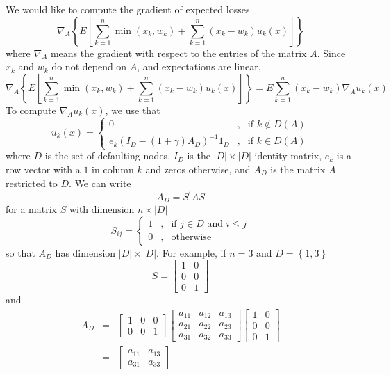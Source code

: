 \documentclass{article}
\begin{document}
We would like to compute the gradient of expected losses%
\[
\nabla _{A}\left\{ E\left[ \sum_{k=1}^{n}\min \left( x_{k},w_{k}\right)
+\sum_{k=1}^{n}\left( x_{k}-w_{k}\right) u_{k}\left( x\right) \right]
\right\} 
\]%
where $\nabla _{A}$ means the gradient with respect to the entries of the
matrix $A$. Since $x_{k}$ and $w_{k}$ do not depend on $A$, and expectations
are linear,%
\[
\nabla _{A}\left\{ E\left[ \sum_{k=1}^{n}\min \left( x_{k},w_{k}\right)
+\sum_{k=1}^{n}\left( x_{k}-w_{k}\right) u_{k}\left( x\right) \right]
\right\} =E\sum_{k=1}^{n}\left( x_{k}-w_{k}\right) \nabla _{A}u_{k}\left(
x\right) 
\]%
To compute $\nabla _{A}u_{k}\left( x\right) $, we use that%
\[
u_{k}\left( x\right) =\left\{ 
\begin{array}{ccc}
0 & , & \text{if }k\notin D\left( A\right)  \\ 
e_{k}\left( I_{D}-\left( 1+\gamma \right) A_{D}\right) ^{-1}1_{D} & , & 
\text{if }k\in D\left( A\right) 
\end{array}%
\right. 
\]%
where $D$ is the set of defaulting nodes, $I_{D}$ is the $\left\vert
D\right\vert \times \left\vert D\right\vert $ identity matrix, $e_{k}$ is a
row vector with a $1$ in column $k$ and zeros otherwise, and $A_{D}$ is the
matrix $A$ restricted to $D$. We can write%
\[
A_{D}=S^{\prime }AS
\]%
for a matrix $S$ with dimension $n\times \left\vert D\right\vert $ 
\[
S_{ij}=\left\{ 
\begin{array}{ccc}
1 & , & \text{if }j\in D\text{ and }i\leq j \\ 
0 & , & \text{otherwise}%
\end{array}%
\right. 
\]%
so that $A_{D}$ has dimension $\left\vert D\right\vert \times \left\vert
D\right\vert $. For example, if $n=3$ and $D=\left\{ 1,3\right\} $ 
\[
S=\left[ 
\begin{array}{cc}
1 & 0 \\ 
0 & 0 \\ 
0 & 1%
\end{array}%
\right] 
\]%
and%
\begin{eqnarray*}
A_{D} &=&\left[ 
\begin{array}{ccc}
1 & 0 & 0 \\ 
0 & 0 & 1%
\end{array}%
\right] \left[ 
\begin{array}{ccc}
a_{11} & a_{12} & a_{13} \\ 
a_{21} & a_{22} & a_{23} \\ 
a_{31} & a_{32} & a_{33}%
\end{array}%
\right] \left[ 
\begin{array}{cc}
1 & 0 \\ 
0 & 0 \\ 
0 & 1%
\end{array}%
\right]  \\
&=&\left[ 
\begin{array}{cc}
a_{11} & a_{13} \\ 
a_{31} & a_{33}%
\end{array}%
\right] 
\end{eqnarray*}%
\end{document}
